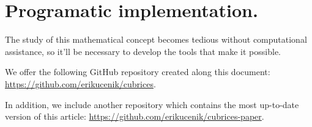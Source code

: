 \section{Programatic implementation.}

The study of this mathematical concept becomes tedious without computational assistance, so it'll be necessary to develop the tools that make it possible.

We offer the following GitHub repository created along this document: \url{https://github.com/erikucenik/cubrices}.

In addition, we include another repository which contains the most up-to-date version of this article: \url{https://github.com/erikucenik/cubrices-paper}.
